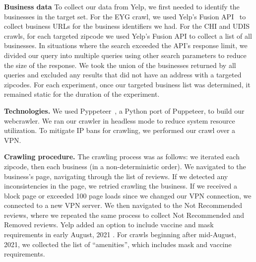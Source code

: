 \textbf{Business data}
To collect our data from Yelp, we first needed to identify the businesses in the target set. For the EYG crawl, we used Yelp's Fusion API~\cite{yelpfusion} to collect business URLs for the business identifiers we had. For the CHI and UDIS crawls, for each targeted zipcode we used Yelp's Fusion API to collect a list of all businesses. In situations where the search exceeded the API's response limit, we divided our query into multiple queries using other search parameters to reduce the size of the response. We took the union of the businesses returned by all queries and excluded any results that did not have an address with a targeted zipcodes. For each experiment, once our targeted business list was determined, it remained static for the duration of the experiment.

\textbf{Technologies.}
We used Pyppeteer~\cite{miyakogi2019May}, a Python port of Puppeteer, to build our webcrawler. We ran our crawler in headless mode to reduce system resource utilization. To mitigate IP bans for crawling,
we performed our crawl over a VPN.

\textbf{Crawling procedure.}
The crawling process was as follows: we iterated each zipcode, then each business (in a non-deterministic order). 
We navigated to the business's page, navigating through the list of reviews. 
If we detected
any inconsistencies in the page, we retried crawling the business. If we received a block page or exceeded 100 page loads since we changed our VPN connection, we connected to a new VPN server.
We then navigated to the Not Recommended reviews, where we repeated the same process to collect Not Recommended and Removed reviews. Yelp added an option to include vaccine and mask requirements in early August, 2021 \cite{yelp2021vaccination}. For crawls beginning after mid-August, 2021, we collected the list of ``amenities'', which includes mask and vaccine requirements. 



